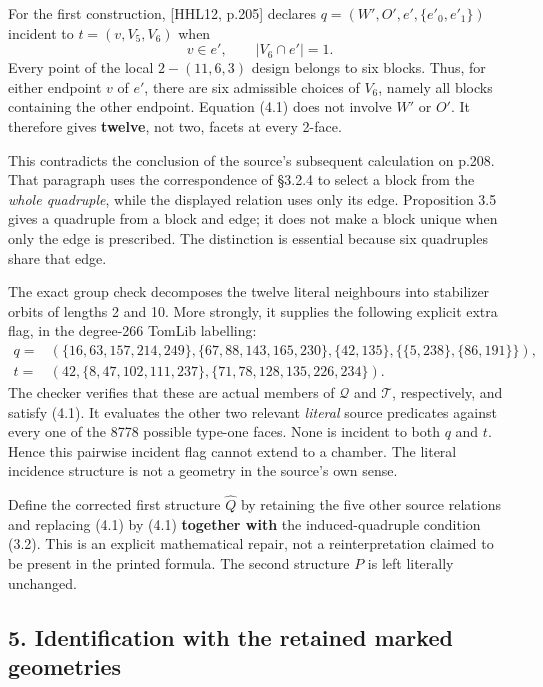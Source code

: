 \documentclass[
  11pt,
  a4paper,
]{article}
\begin{document}
For the first construction, {[}HHL12, p.205{]} declares
\(q=(W',O',e',\{e'_0,e'_1\})\) incident to \(t=(v,V_5,V_6)\) when \[
 v\in e',\qquad |V_6\cap e'|=1.
 \tag{4.1}
\] Every point of the local \(2\!-(11,6,3)\) design belongs to six
blocks. Thus, for either endpoint \(v\) of \(e'\), there are six
admissible choices of \(V_6\), namely all blocks containing the other
endpoint. Equation (4.1) does not involve \(W'\) or \(O'\). It therefore
gives \textbf{twelve}, not two, facets at every 2-face.

This contradicts the conclusion of the source's subsequent calculation
on p.208. That paragraph uses the correspondence of §3.2.4 to select a
block from the \emph{whole quadruple}, while the displayed relation uses
only its edge. Proposition 3.5 gives a quadruple from a block and edge;
it does not make a block unique when only the edge is prescribed. The
distinction is essential because six quadruples share that edge.

The exact group check decomposes the twelve literal neighbours into
stabilizer orbits of lengths 2 and 10. More strongly, it supplies the
following explicit extra flag, in the degree-266 TomLib labelling: \[
\begin{aligned}
 q={}&(\{16,63,157,214,249\},\{67,88,143,165,230\},
          \{42,135\},\{\{5,238\},\{86,191\}\}),\\
 t={}&(42,\{8,47,102,111,237\},
          \{71,78,128,135,226,234\}).
\end{aligned}
\] The checker verifies that these are actual members of \(\mathcal Q\)
and \(\mathcal T\), respectively, and satisfy (4.1). It evaluates the
other two relevant \emph{literal} source predicates against every one of
the 8778 possible type-one faces. None is incident to both \(q\) and
\(t\). Hence this pairwise incident flag cannot extend to a chamber. The
literal incidence structure is not a geometry in the source's own sense.

Define the corrected first structure \(\widehat Q\) by retaining the
five other source relations and replacing (4.1) by (4.1)
\textbf{together with} the induced-quadruple condition (3.2). This is an
explicit mathematical repair, not a reinterpretation claimed to be
present in the printed formula. The second structure \(P\) is left
literally unchanged.

\subsection{5. Identification with the retained marked
geometries}\label{identification-with-the-retained-marked-geometries}
\end{document}
